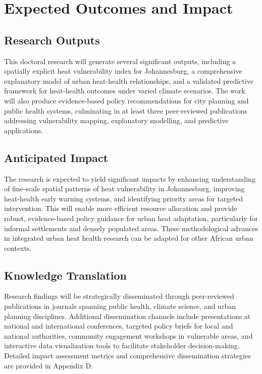 \section{Expected Outcomes and Impact}

\subsection{Research Outputs}
This doctoral research will generate several significant outputs, including a spatially explicit heat vulnerability index for Johannesburg, a comprehensive explanatory model of urban heat-health relationships, and a validated predictive framework for heat-health outcomes under varied climate scenarios. The work will also produce evidence-based policy recommendations for city planning and public health systems, culminating in at least three peer-reviewed publications addressing vulnerability mapping, explanatory modelling, and predictive applications.

\subsection{Anticipated Impact}
The research is expected to yield significant impacts by enhancing understanding of fine-scale spatial patterns of heat vulnerability in Johannesburg, improving heat-health early warning systems, and identifying priority areas for targeted intervention. This will enable more efficient resource allocation and provide robust, evidence-based policy guidance for urban heat adaptation, particularly for informal settlements and densely populated areas. These methodological advances in integrated urban heat health research can be adapted for other African urban contexts.

\subsection{Knowledge Translation}
Research findings will be strategically disseminated through peer-reviewed publications in journals spanning public health, climate science, and urban planning disciplines. Additional dissemination channels include presentations at national and international conferences, targeted policy briefs for local and national authorities, community engagement workshops in vulnerable areas, and interactive data visualization tools to facilitate stakeholder decision-making. Detailed impact assessment metrics and comprehensive dissemination strategies are provided in Appendix D.